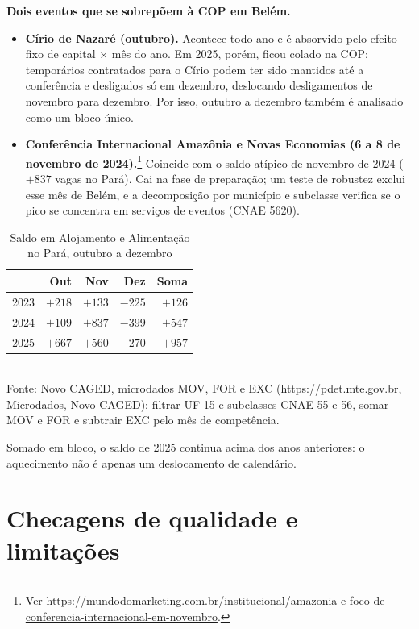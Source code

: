 \textbf{Dois eventos que se sobrepõem à COP em Belém.}
\begin{itemize}
  \item \textbf{Círio de Nazaré (outubro).} Acontece todo ano e é absorvido pelo efeito fixo de capital
        $\times$ mês do ano. Em 2025, porém, ficou colado na COP: temporários contratados para o Círio podem
        ter sido mantidos até a conferência e desligados só em dezembro, deslocando desligamentos de
        novembro para dezembro. Por isso, outubro a dezembro também é analisado como um bloco único.
  \item \textbf{Conferência Internacional Amazônia e Novas Economias (6 a 8 de novembro de
        2024).}\footnote{Ver \url{https://mundodomarketing.com.br/institucional/amazonia-e-foco-de-conferencia-internacional-em-novembro}.}
        Coincide com o saldo atípico de novembro de 2024 ($+837$ vagas no Pará). Cai na fase de preparação;
        um teste de robustez exclui esse mês de Belém, e a decomposição por município e subclasse verifica
        se o pico se concentra em serviços de eventos (CNAE 5620).
\end{itemize}

\begin{table}[H]
\centering\small
\caption{Saldo em Alojamento e Alimentação no Pará, outubro a dezembro}\label{tab:outdez}
\begin{tabular}{lrrrr}
\toprule
& \textbf{Out} & \textbf{Nov} & \textbf{Dez} & \textbf{Soma}\\
\midrule
2023 & $+218$ & $+133$ & $-225$ & $+126$\\
2024 & $+109$ & $+837$ & $-399$ & $+547$\\
2025 & $+667$ & $+560$ & $-270$ & $+957$\\
\bottomrule
\end{tabular}\\[3pt]
{\footnotesize Fonte: Novo CAGED, microdados MOV, FOR e EXC (\url{https://pdet.mte.gov.br}, Microdados, Novo CAGED):
filtrar UF 15 e subclasses CNAE 55 e 56, somar MOV e FOR e subtrair EXC pelo mês de competência.}
\end{table}

Somado em bloco, o saldo de 2025 continua acima dos anos anteriores: o aquecimento não é apenas um
deslocamento de calendário.


\section{Checagens de qualidade e limitações}\label{sec:checagens}

